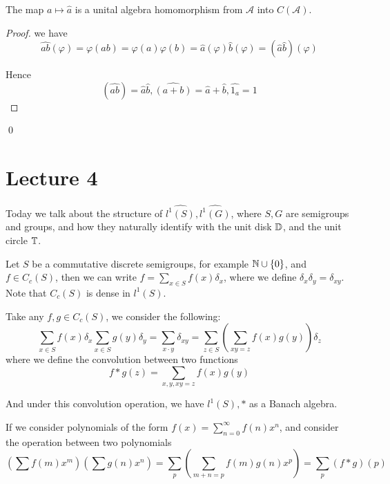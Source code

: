 \begin{proposition}
    The map $a\mapsto\widehat{a}$ is a unital algebra homomorphism from $\mathcal{A}$ into $C(\mathcal{A})$.
\end{proposition}
\begin{proof}
    we have
\begin{equation*}
    \widehat{ab}(\varphi)=\varphi(ab)=\varphi(a)\varphi(b)=\widehat{a}(\varphi)\widehat{b}(\varphi)=(\widehat{a}\widehat{b})(\varphi)
\end{equation*}

Hence
\begin{equation*}
    (\widehat{ab})=\widehat{a}\widehat{b}, \widehat{(a+b)}=\widehat{a}+\widehat{b}, \widehat{1_a}=1
\end{equation*}
\end{proof}
\qed


\section{Lecture 4}
Today we talk about the structure of $\widehat{l^1(S)}, \widehat{l^1(G)}$, where $S,G$ are semigroups and groups, and how they naturally identify with the unit disk $\mathbb{D}$, and the unit circle $\mathbb{T}$.

Let $S$ be a commutative discrete semigroups, for example $\mathbb{N}\cup\{0\}$, and $f\in C_c(S)$, then we can write $f=\sum_{x\in S}f(x)\delta_x$, where we define $\delta_x\delta_y=\delta_{xy}$. Note that $C_c(S)$ is dense in $l^1(S)$.
\begin{definition}[Convolution]
    Take any $f,g\in C_c(S)$, we consider the following:
    \begin{equation*}
        \sum_{x\in S}f(x)\delta_x\sum_{x\in S}g(y)\delta_y=\sum_{x\cdot y}\delta_{xy}=\sum_{z\in S}\left(\sum_{xy=z}f(x)g(y)\right)\delta_z
    \end{equation*}
    where we define the convolution between two functions
    \begin{equation*}
        f\ast g(z)=\sum_{x,y, xy=z}f(x)g(y)
    \end{equation*}
\end{definition}

And under this convolution operation, we have $l^1(S), \ast$ as a Banach algebra.
\begin{example}
    If we consider polynomials of the form $f(x)=\sum_{n=0}^\infty f(n)x^n$, and consider the operation between two polynomials
    \begin{equation*}
        \left(\sum f(m)x^m\right)\left(\sum g(n)x^n \right)=\sum_{p}\left(\sum_{m+n=p}f(m)g(n)x^p \right)=\sum_{p}(f\ast g)(p)
    \end{equation*}
\end{example}

